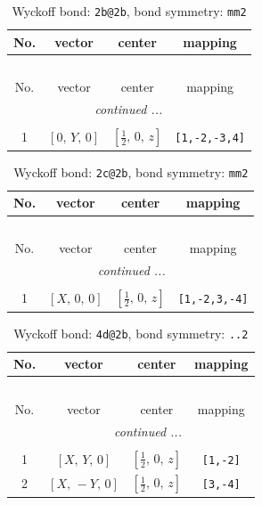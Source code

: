 \documentclass[fleqn,8pt]{jsarticle}
\begin{document}
\begin{longtable}{cccc}
\caption{Wyckoff bond: {\tt 2b@2b}, bond symmetry: {\tt mm2}}
 \\
 \hline \hline
No. & vector & center & mapping \\ \hline \endfirsthead

\multicolumn{3}{l}{\tablename\ \thetable{}} \\
 \hline \hline
No. & vector & center & mapping \\ \hline \endhead

 \hline \hline
\multicolumn{3}{r}{\footnotesize\it continued ...} \\ \endfoot

 \hline \hline
\multicolumn{3}{r}{} \\ \endlastfoot

1 & $\left[ 0,\, Y,\, 0 \right]$ & $\left[ \frac{1}{2},\, 0,\, z \right]$ & {\tt [1,-2,-3,4]} \\
\end{longtable}
\renewcommand{\arraystretch}{1.2}
\begin{longtable}{cccc}
\caption{Wyckoff bond: {\tt 2c@2b}, bond symmetry: {\tt mm2}}
 \\
 \hline \hline
No. & vector & center & mapping \\ \hline \endfirsthead

\multicolumn{3}{l}{\tablename\ \thetable{}} \\
 \hline \hline
No. & vector & center & mapping \\ \hline \endhead

 \hline \hline
\multicolumn{3}{r}{\footnotesize\it continued ...} \\ \endfoot

 \hline \hline
\multicolumn{3}{r}{} \\ \endlastfoot

1 & $\left[ X,\, 0,\, 0 \right]$ & $\left[ \frac{1}{2},\, 0,\, z \right]$ & {\tt [1,-2,3,-4]} \\
\end{longtable}
\renewcommand{\arraystretch}{1.2}
\begin{longtable}{cccc}
\caption{Wyckoff bond: {\tt 4d@2b}, bond symmetry: {\tt ..2}}
 \\
 \hline \hline
No. & vector & center & mapping \\ \hline \endfirsthead

\multicolumn{3}{l}{\tablename\ \thetable{}} \\
 \hline \hline
No. & vector & center & mapping \\ \hline \endhead

 \hline \hline
\multicolumn{3}{r}{\footnotesize\it continued ...} \\ \endfoot

 \hline \hline
\multicolumn{3}{r}{} \\ \endlastfoot

1 & $\left[ X,\, Y,\, 0 \right]$ & $\left[ \frac{1}{2},\, 0,\, z \right]$ & {\tt [1,-2]} \\ \hline
2 & $\left[ X,\, - Y,\, 0 \right]$ & $\left[ \frac{1}{2},\, 0,\, z \right]$ & {\tt [3,-4]} \\
\end{longtable}
\end{document}
